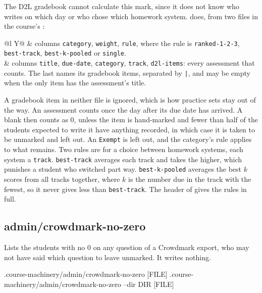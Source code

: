 The D2L gradebook cannot calculate this mark, since it does not know who writes on which day or who chose which homework system.
 does, from two files in the course's :

\begin{center}
\begin{tabularx}{\linewidth}{@{}l Y@{}}
 & columns \texttt{category}, \texttt{weight}, \texttt{rule}, where the rule is \texttt{ranked-1-2-3}, \texttt{best-track}, \texttt{best-k-pooled} or \texttt{single}.\\
 & columns \texttt{title}, \texttt{due-date}, \texttt{category}, \texttt{track}, \texttt{d2l-items}: every assessment that counts. The last names its gradebook items, separated by \texttt{|}, and may be empty when the only item has the assessment's title.\\
\end{tabularx}
\end{center}

A gradebook item in neither file is ignored, which is how practice sets stay out of the way.
An assessment counts once the day after its due date has arrived.
A blank then counts as 0, unless the item is hand-marked and fewer than half of the students expected to write it have anything recorded, in which case it is taken to be unmarked and left out.
An \texttt{Exempt} is left out, and the category's rule applies to what remains.
Two rules are for a choice between homework systems, each system a \texttt{track}.
\texttt{best-track} averages each track and takes the higher, which punishes a student who switched part way.
\texttt{best-k-pooled} averages the best $k$ scores from all tracks together, where $k$ is the number due in the track with the fewest, so it never gives less than \texttt{best-track}.
The header of  gives the rules in full.

\subsection*{admin/crowdmark-no-zero}

Lists the students with no 0 on any question of a Crowdmark export, who may not have said which question to leave unmarked.
It writes nothing.

\begin{manexsource}
.course-machinery/admin/crowdmark-no-zero [FILE]
.course-machinery/admin/crowdmark-no-zero --dir DIR [FILE]
\end{manexsource}

